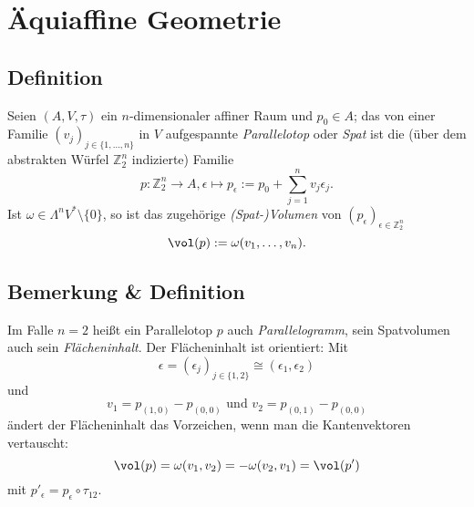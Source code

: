 \section{Äquiaffine Geometrie}
\subsection{Definition}
	\begin{Definition}
		Seien $ (A,V,\tau) $ ein $ n $-dimensionaler affiner Raum und $ p_0\in A $; das von einer Familie $ (v_j)_{j\in \{1,\dots,n\}} $ in $ V $ aufgespannte \emph{Parallelotop} oder \emph{Spat} ist die (über dem abstrakten Würfel $ \mathbb{Z}_2^n $ indizierte) Familie
			\[ p: \mathbb{Z}_2^n\to A, \epsilon \mapsto p_\epsilon := p_0 +\sum_{j=1}^{n}v_j\epsilon_j. \]
		Ist $ \omega\in\Lambda^nV^*\setminus\{0\} $, so ist das zugehörige \emph{(Spat-)Volumen} von $ (p_\epsilon)_{\epsilon \in \mathbb{Z}_2^n} $
			\[ \vol(p):= \omega(v_1,\dots,v_n). \]
	\end{Definition}
\begin{figure}[H]
	\centering
{}
\end{figure}
\subsection{Bemerkung \& Definition}
	\begin{Definition}
		Im Falle $ n=2 $ heißt ein Parallelotop $ p $ auch \emph{Parallelogramm}, sein Spatvolumen auch sein \emph{Flächeninhalt}. Der Flächeninhalt ist orientiert:
		Mit
			\[ \epsilon = (\epsilon_j)_{j\in \{1,2\}}\cong (\epsilon_1,\epsilon_2) \]
		und
			\[ v_1 = p_{(1,0)}-p_{(0,0)}\text{ und } v_2 = p_{(0,1)}-p_{(0,0)} \]
		ändert der Flächeninhalt das Vorzeichen, wenn man die Kantenvektoren vertauscht:
			\[ \vol(p) = \omega(v_1,v_2) = -\omega(v_2,v_1) = \vol(p') \]
		mit $ p'_\epsilon = p_\epsilon \circ \tau_{12} $.
	\end{Definition}
